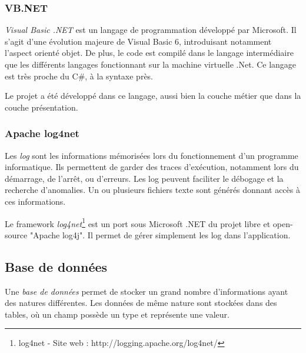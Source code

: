 
\subsubsection{VB.NET}

\textit{Visual Basic .NET} est un langage de programmation développé par Microsoft.
Il s'agit d'une évolution majeure de Visual Basic 6, introduisant notamment l'aspect orienté objet.
De plus, le code est compilé dans le langage intermédiaire que les différents langages fonctionnant sur la machine virtuelle .Net.
Ce langage est très proche du C\#, à la syntaxe près.

Le projet a été développé dans ce langage, aussi bien la couche métier que dans la couche présentation.


\subsubsection{Apache log4net}


Les \textit{log} sont les informations mémorisées lors du fonctionnement d'un programme informatique.
Ils permettent de garder des traces d'exécution, notamment lors du démarrage, de l'arrêt, ou d'erreurs.
Les log peuvent faciliter le débogage et la recherche d'anomalies.
Un ou plusieurs fichiers texte sont générés donnant accès à ces informations.

Le framework \textit{log4net}\footnote{log4net - Site web : http://logging.apache.org/log4net/} est un port sous Microsoft .NET du projet libre et open-source "Apache log4j".
Il permet de gérer simplement les log dans l'application.


\subsection{Base de données}

Une \textit{base de données} permet de stocker un grand nombre d'informations ayant des natures différentes.
Les données de même nature sont stockées dans des tables, où un champ possède un type et représente une valeur.


